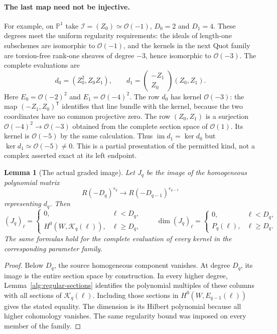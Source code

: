 \documentclass[11pt,reqno]{amsart}
\numberwithin{equation}{section}
\newtheorem{lemma}[theorem]{Lemma}
\theoremstyle{definition}
\theoremstyle{remark}
\newcommand{\Pj}{\mathbb P}
\newcommand{\cO}{\mathcal O}
\DeclareMathOperator{\im}{im}
\begin{document}
\paragraph{The last map need not be injective.}
For example, on $\Pj^1$ take $\mathscr I=(Z_0)\simeq\cO(-1)$,
$D_0=2$ and $D_1=4$. These degrees meet the uniform regularity
requirements: the ideals of length-one subschemes are isomorphic to
$\cO(-1)$, and the kernels in the next Quot family are torsion-free
rank-one sheaves of degree $-3$, hence isomorphic to $\cO(-3)$.
The complete evaluations are
\[
 d_0=(Z_0^2, Z_0Z_1),\qquad
 d_1=\begin{pmatrix}-Z_1\\ Z_0\end{pmatrix}(Z_0,Z_1).
\]
Here $E_0=\cO(-2)^2$ and $E_1=\cO(-4)^2$. The row $d_0$ has
kernel $\cO(-3)$: the map $(-Z_1,Z_0)^{\mathsf T}$ identifies
that line bundle with the kernel, because the two coordinates
have no common projective zero. The row $(Z_0,Z_1)$ is a surjection
$\cO(-4)^2\to\cO(-3)$ obtained from the complete section space
of $\cO(1)$. Its kernel is $\cO(-5)$ by the same calculation.
Thus $\im d_1=\ker d_0$ but $\ker d_1\simeq\cO(-5)\ne0$.
This is a partial presentation of the permitted kind, not a complex
asserted exact at its left endpoint.

\begin{lemma}[The actual graded image]
\label{alg:evaluation-image}
Let \(J_q\) be the image of the homogeneous polynomial matrix
\[
 R(-D_q)^{r_q}\longrightarrow R(-D_{q-1})^{r_{q-1}}
\]
representing \(d_q\). Then
\begin{equation}
 (J_q)_\ell=
 \begin{cases}
  0,&\ell<D_q,\\
  H^0(W,\mathscr K_q(\ell)),&\ell\geq D_q,
 \end{cases}
 \qquad
 \dim(J_q)_\ell=
 \begin{cases}
  0,&\ell<D_q,\\
  P_q(\ell),&\ell\geq D_q.
 \end{cases}
 \label{alg:image-function}
\end{equation}
The same formulas hold for the complete evaluation of every kernel in
the corresponding parameter family.
\end{lemma}

\begin{proof}
Below \(D_q\), the source homogeneous component vanishes. At degree
\(D_q\), its image is the entire section space by construction. In every
higher degree, Lemma~\ref{alg:regular-sections} identifies the polynomial
multiples of these columns with all sections of
\(\mathscr K_q(\ell)\). Including those sections in
\(H^0(W,E_{q-1}(\ell))\) gives the stated equality. The dimension is its
Hilbert polynomial because all higher cohomology vanishes. The same
regularity bound was imposed on every member of the family.
\end{proof}
\end{document}
